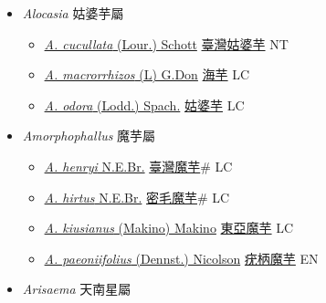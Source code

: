 
  \begin{itemize}
 \item[] \textit{Alocasia} 姑婆芋屬
                    
  \begin{itemize}
        \item[] \href{http://www.theplantlist.org/tpl1.1/search?q=Alocasia+cucullata}{\textit{A. cucullata} (Lour.) Schott}   \href{\detokenize{http://taibnet.sinica.edu.tw/chi/taibnet_species_list.php?T2=臺灣姑婆芋&T2_new_value=true&fr=y}}{臺灣姑婆芋} NT
        \item[] \href{http://www.theplantlist.org/tpl1.1/search?q=Alocasia+macrorrhizos}{\textit{A. macrorrhizos} (L) G.Don}   \href{\detokenize{http://taibnet.sinica.edu.tw/chi/taibnet_species_list.php?T2=海芋&T2_new_value=true&fr=y}}{海芋} LC
        \item[] \href{http://www.theplantlist.org/tpl1.1/search?q=Alocasia+odora}{\textit{A. odora} (Lodd.) Spach.}   \href{\detokenize{http://taibnet.sinica.edu.tw/chi/taibnet_species_list.php?T2=姑婆芋&T2_new_value=true&fr=y}}{姑婆芋} LC
  \end{itemize}
 \item[] \textit{Amorphophallus} 魔芋屬
                    
  \begin{itemize}
        \item[] \href{http://www.theplantlist.org/tpl1.1/search?q=Amorphophallus+henryi}{\textit{A. henryi} N.E.Br.}   \href{\detokenize{http://taibnet.sinica.edu.tw/chi/taibnet_species_list.php?T2=臺灣魔芋&T2_new_value=true&fr=y}}{臺灣魔芋}\# LC
        \item[] \href{http://www.theplantlist.org/tpl1.1/search?q=Amorphophallus+hirtus}{\textit{A. hirtus} N.E.Br.}   \href{\detokenize{http://taibnet.sinica.edu.tw/chi/taibnet_species_list.php?T2=密毛魔芋&T2_new_value=true&fr=y}}{密毛魔芋}\# LC
        \item[] \href{http://www.theplantlist.org/tpl1.1/search?q=Amorphophallus+kiusianus}{\textit{A. kiusianus} (Makino) Makino}   \href{\detokenize{http://taibnet.sinica.edu.tw/chi/taibnet_species_list.php?T2=東亞魔芋&T2_new_value=true&fr=y}}{東亞魔芋} LC
        \item[] \href{http://www.theplantlist.org/tpl1.1/search?q=Amorphophallus+paeoniifolius}{\textit{A. paeoniifolius} (Dennst.) Nicolson}   \href{\detokenize{http://taibnet.sinica.edu.tw/chi/taibnet_species_list.php?T2=疣柄魔芋&T2_new_value=true&fr=y}}{疣柄魔芋} EN
  \end{itemize}
 \item[] \textit{Arisaema} 天南星屬
                    

\end{itemize}
